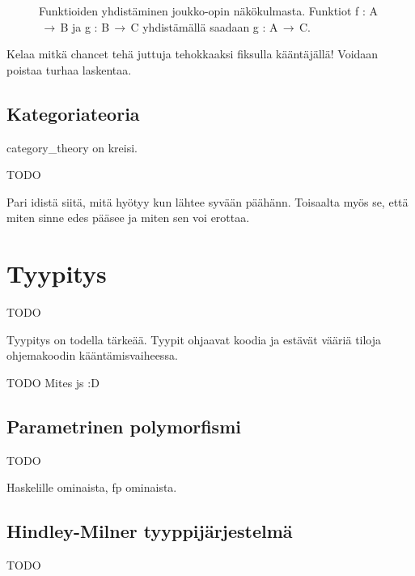 \begin{figure}[htbp]
	\caption{Funktioiden yhdistäminen joukko-opin näkökulmasta. Funktiot f : A$\,\to\,$B ja g : B$\,\to\,$C yhdistämällä saadaan g : A$\,\to\,$C.}
\end{figure}


Kelaa mitkä chancet tehä juttuja tehokkaaksi fiksulla kääntäjällä! Voidaan poistaa turhaa laskentaa.

\subsection{Kategoriateoria}

\Gls{category_theory} on kreisi.

TODO

Pari idistä siitä, mitä hyötyy kun lähtee syvään päähänn. Toisaalta myös se, että miten sinne edes pääsee ja miten sen voi erottaa.

\section{Tyypitys}

TODO

Tyypitys on todella tärkeää. Tyypit ohjaavat koodia ja estävät vääriä tiloja ohjemakoodin kääntämisvaiheessa.

TODO Mites \gls{js} :D



\subsection{Parametrinen polymorfismi}

TODO

Haskelille ominaista, \gls{fp} ominaista.


\subsection{Hindley-Milner tyyppijärjestelmä}

TODO

